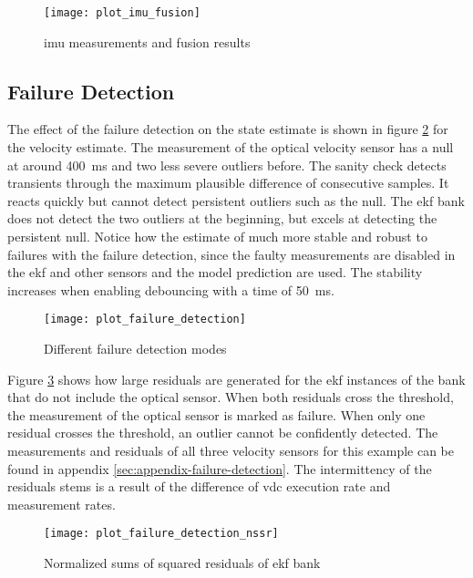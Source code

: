 \begin{figure}[t]
	\centering
	\texttt{[image: plot\_imu\_fusion]}%
	\caption{\gls{imu} measurements and fusion results}
	\label{fig:imu-fusion}
\end{figure}


\subsection{Failure Detection}
The effect of the failure detection on the state estimate is shown in figure \ref{fig:failure-detection} for the velocity estimate. The measurement of the optical velocity sensor has a null at around \SI{400}{\milli\second} and two less severe outliers before. The sanity check detects transients through the maximum plausible difference of consecutive samples. It reacts quickly but cannot detect persistent outliers such as the null. The \gls{ekf} bank does not detect the two outliers at the beginning, but excels at detecting the persistent null. Notice how the estimate of much more stable and robust to failures with the failure detection, since the faulty measurements are disabled in the \gls{ekf} and other sensors and the model prediction are used. The stability increases when enabling debouncing with a time of \SI{50}{\milli\second}.

\begin{figure}[t]
	\centering
	\texttt{[image: plot\_failure\_detection]}%
	\caption{Different failure detection modes}
	\label{fig:failure-detection}
\end{figure}

Figure \ref{fig:failure-detection-nssr} shows how large residuals are generated for the \gls{ekf} instances of the bank that do not include the optical sensor. When both residuals cross the threshold, the measurement of the optical sensor is marked as failure. When only one residual crosses the threshold, an outlier cannot be confidently detected. The measurements and residuals of all three velocity sensors for this example can be found in appendix \ref{sec:appendix-failure-detection}. The intermittency of the residuals stems is a result of the difference of \gls{vdc} execution rate and measurement rates.

\begin{figure}[t]
	\centering
	\texttt{[image: plot\_failure\_detection\_nssr]}%
	\caption{Normalized sums of squared residuals of \gls{ekf} bank}
	\label{fig:failure-detection-nssr}
\end{figure}

